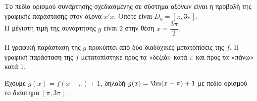 \begin{alist}
\item Το πεδίο ορισμού συνάρτησης σχεδιασμένης σε σύστημα αξόνων είναι η προβολή της γραφικής παράστασης στον άξονα $x'x$. Οπότε είναι $D_g = [\pi, 3\pi]$. \\
Η μέγιστη τιμή της συνάρτησης $g$ είναι $2$ στην θέση $x = \dfrac{3\pi}{2}$.
\item
\begin{rlist}
\item Η γραφική παράσταση της $g$ προκύπτει από δύο διαδοχικές μετατοπίσεις της $f$. Η γραφική παράσταση της $f$ μετατοπίστηκε προς τα «δεξιά» κατά $\pi$ και προς τα «πάνω» κατά $1$.
\item Έχουμε $g(x) = f(x - \pi) + 1$, δηλαδή $g(x) = \hm (x - \pi) + 1$ με πεδίο ορισμού το διάστημα $[\pi, 3\pi]$.
\end{rlist}
\end{alist}


